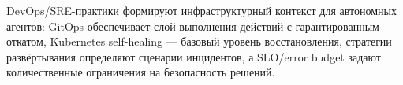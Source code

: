 \medskip

DevOps/SRE-практики формируют инфраструктурный контекст для автономных агентов: GitOps обеспечивает слой выполнения действий с гарантированным откатом, Kubernetes self-healing --- базовый уровень восстановления, стратегии развёртывания определяют сценарии инцидентов, а SLO/error budget задают количественные ограничения на безопасность решений.
